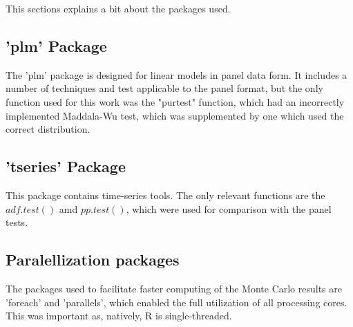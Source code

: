 This sections explains a bit about the packages used.

\subsection{'plm' Package}

The 'plm' package is designed for linear models in panel data form. It includes a number of techniques and test applicable to the panel format, but the only function used for this work was the "purtest" function, which had an incorrectly implemented Maddala-Wu test, which was supplemented by one which used the correct distribution.

\subsection{'tseries' Package}

This package contains time-series tools. The only relevant functions are the $adf.test()$ amd $pp.test()$, which were used for comparison with the panel tests.

\subsection{Paralellization packages}

The packages used to facilitate faster computing of the Monte Carlo results are 'foreach' and 'parallels', which enabled the full utilization of all processing cores. This was important as, natively, R is single-threaded.